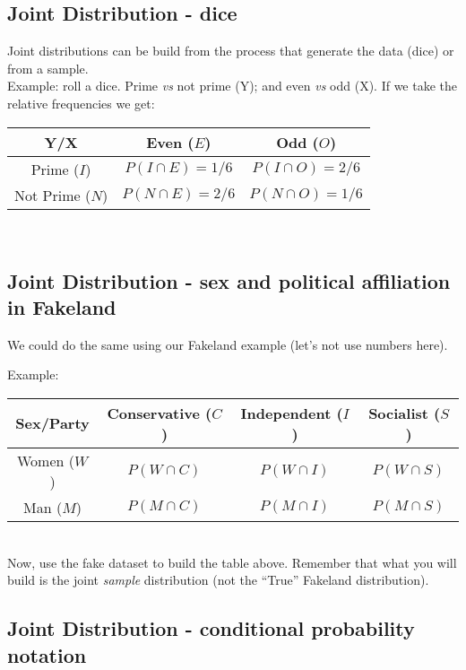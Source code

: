 \documentclass[11pt]{article}
\begin{document}
	\subsection*{Joint Distribution - dice}
	Joint distributions can be build from the process that generate the data (dice) or from a sample.
	\newline\\
	Example: roll a dice. Prime \emph{vs} not prime (Y); and even \emph{vs} odd (X). If we take the relative frequencies we get:\newline\\
	\begin{tabular}{|c|cc|}
\hline
	Y/X & Even ($E$) & Odd ($O$)\\
\hline
	Prime ($I$) & $P(I \cap E) = 1/6$ & $P(I \cap O) = 2/6$\\
	Not Prime ($N$) & $P(N \cap E) = 2/6$ & $P(N \cap O)= 1/6$ \\
\hline
\end{tabular}\newline\\


	\subsection*{Joint Distribution - sex and political affiliation in Fakeland}

	We could do the same using our Fakeland example (let's not use numbers here).

	Example:\newline\\
	\begin{tabular}{|c|ccc|}
\hline
	Sex/Party & Conservative ($C$) & Independent ($I$) & Socialist ($S$)\\
\hline
	Women ($W$) & $P(W \cap C)$ & $P(W \cap I)$ & $P(W \cap S)$\\
	Man ($M$) & $P(M \cap C)$ & $P(M \cap I)$ & $P(M \cap S)$ \\
\hline

\end{tabular}\newline\\

Now, use the fake dataset to build the table above. Remember that what you will build is the joint \emph{sample} distribution (not the ``True'' Fakeland distribution).

	\subsection*{Joint Distribution - conditional probability notation}
	
\end{document}
